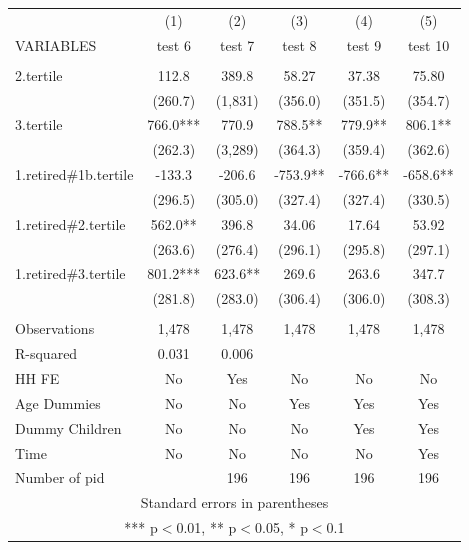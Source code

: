 \begin{tabular}{lccccc} \hline
 & (1) & (2) & (3) & (4) & (5) \\
VARIABLES & test 6 & test 7 & test 8 & test 9 & test 10 \\ \hline
 &  &  &  &  &  \\
2.tertile & 112.8 & 389.8 & 58.27 & 37.38 & 75.80 \\
 & (260.7) & (1,831) & (356.0) & (351.5) & (354.7) \\
3.tertile & 766.0*** & 770.9 & 788.5** & 779.9** & 806.1** \\
 & (262.3) & (3,289) & (364.3) & (359.4) & (362.6) \\
1.retired\#1b.tertile & -133.3 & -206.6 & -753.9** & -766.6** & -658.6** \\
 & (296.5) & (305.0) & (327.4) & (327.4) & (330.5) \\
1.retired\#2.tertile & 562.0** & 396.8 & 34.06 & 17.64 & 53.92 \\
 & (263.6) & (276.4) & (296.1) & (295.8) & (297.1) \\
1.retired\#3.tertile & 801.2*** & 623.6** & 269.6 & 263.6 & 347.7 \\
 & (281.8) & (283.0) & (306.4) & (306.0) & (308.3) \\
 &  &  &  &  &  \\
Observations & 1,478 & 1,478 & 1,478 & 1,478 & 1,478 \\
R-squared & 0.031 & 0.006 &  &  &  \\
HH FE & No & Yes & No & No & No \\
Age Dummies & No & No & Yes & Yes & Yes \\
Dummy Children & No & No & No & Yes & Yes \\
Time & No & No & No & No & Yes \\
 Number of pid &  & 196 & 196 & 196 & 196 \\ \hline
\multicolumn{6}{c}{ Standard errors in parentheses} \\
\multicolumn{6}{c}{ *** p$<$0.01, ** p$<$0.05, * p$<$0.1} \\
\end{tabular}

